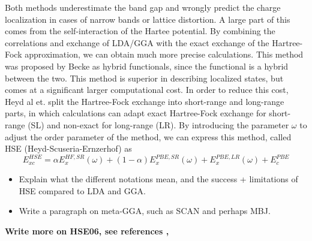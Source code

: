 Both methods underestimate the band gap and wrongly predict the charge localization in cases of narrow bands or lattice distortion. A large part of this comes from the self-interaction of the Hartee potential. By combining the correlations and exchange of LDA/GGA with the exact exchange of the Hartree-Fock approximation, we can obtain much more precise calculations. This method was proposed by Becke as hybrid functionals, since the functional is a hybrid between the two. This method is superior in describing localized states, but comes at a significant larger computational cost. In order to reduce this cost, Heyd al et. split the Hartree-Fock exchange into short-range and long-range parts, in which calculations can adapt exact Hartree-Fock exchange for short-range (SL) and non-exact for long-range (LR). By introducing the parameter $\omega$ to adjust the order parameter of the method, we can express this method, called HSE (Heyd-Scuseria-Ernzerhof) \cite{hse06} as
\begin{equation}
    E_{xc}^{HSE} = \alpha E_{x}^{HF,SR}(\omega) + (1-\alpha)E_{x}^{PBE, SR}(\omega) + E_x^{PBE,LR}(\omega) + E_{c}^{PBE}
\end{equation}
\begin{itemize}
    \item Explain what the different notations mean, and the success + limitations of HSE compared to LDA and GGA.
    \item Write a paragraph on meta-GGA, such as SCAN and perhaps MBJ.
\end{itemize}
\textbf{Write more on HSE06, see references \cite{hf_bandgap}, \cite{hf_comparision}}

